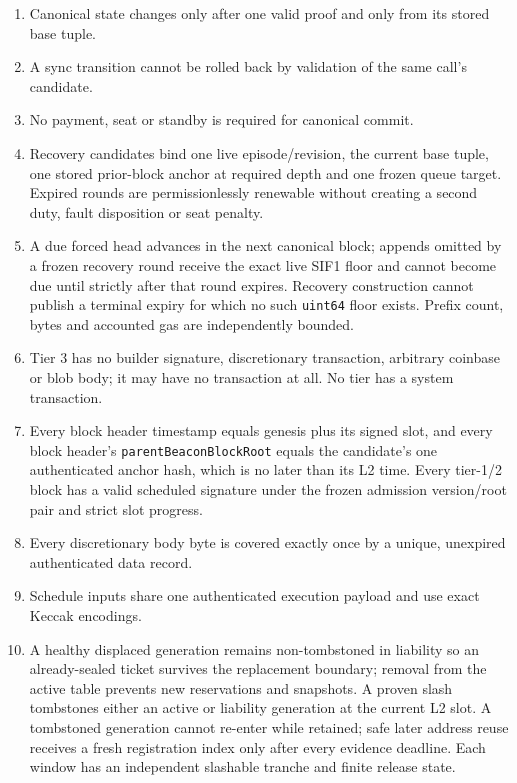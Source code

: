 \documentclass[a4paper,11pt]{article}
\newcommand{\code}[1]{\nolinkurl{#1}}
\begin{document}
{\small
\begin{enumerate}
\item Canonical state changes only after one valid proof and only from its stored
base tuple.
\item A sync transition cannot be rolled back by validation of the same call's
candidate.
\item No payment, seat or standby is required for canonical commit.
\item Recovery candidates bind one live episode/revision, the current base
tuple, one stored prior-block anchor at required depth and one frozen queue
target.  Expired rounds are permissionlessly renewable without creating a
second duty, fault disposition or seat penalty.
\item A due forced head advances in the next canonical block; appends omitted
by a frozen recovery round receive the exact live SIF1 floor and cannot become
due until strictly after that round expires.  Recovery construction cannot
publish a terminal expiry for which no such \code{uint64} floor exists.  Prefix
count, bytes and accounted gas are independently bounded.
\item Tier 3 has no builder signature, discretionary transaction, arbitrary
coinbase or blob body; it may have no transaction at all.  No tier has a
system transaction.
\item Every block header timestamp equals genesis plus its signed slot, and
every block header's \code{parentBeaconBlockRoot} equals the candidate's one
authenticated anchor hash, which is no later than its L2 time.  Every
tier-1/2 block has a valid scheduled signature under the frozen admission
version/root pair and strict slot progress.
\item Every discretionary body byte is covered exactly once by a unique,
unexpired authenticated data record.
\item Schedule inputs share one authenticated execution payload and use exact
Keccak encodings.
\item A healthy displaced generation remains non-tombstoned in liability so an
already-sealed ticket survives the replacement boundary; removal from the
active table prevents new reservations and snapshots.  A proven slash
tombstones either an active or liability generation at the current L2 slot.  A
tombstoned generation cannot re-enter while retained; safe later address reuse
receives a fresh registration index only after every evidence deadline.  Each
window has an independent slashable tranche and finite release state.

\end{enumerate}}
\end{document}
